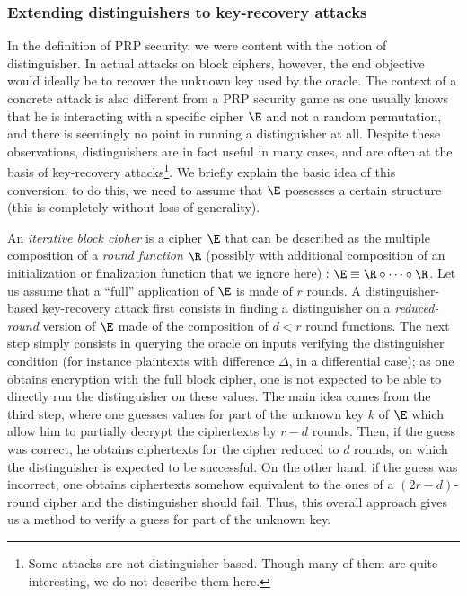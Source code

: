 \subsubsection{Extending distinguishers to key-recovery attacks}

In the definition of PRP security, we were content with the notion of distinguisher. In actual attacks on block ciphers, however, the end objective
would ideally be to recover the unknown key used by the oracle. The context of a concrete attack is also different from a PRP security game as one usually knows that he is interacting with a specific
cipher $\E$ and not a random permutation, and there is seemingly no point in running a distinguisher at all.
Despite these observations, distinguishers are in fact useful in many cases, and are often at the basis of key-recovery attacks\footnote{Some attacks
are not distinguisher-based. Though many of them are quite interesting, we do not describe them here.}. We briefly explain
the basic idea of this conversion; to do this, we need to assume that $\E$ possesses a certain structure (this is completely without loss of generality).

An \emph{iterative block cipher} is a cipher $\E$ that can be described as the multiple composition of a \emph{round function} $\R$ (possibly with additional
composition of an initialization or finalization function that we ignore here) : $\E \equiv \R \circ \cdots \circ \R$. Let us assume that a ``full''
application of $\E$ is made of $r$ rounds. A distinguisher-based key-recovery attack first consists in finding a distinguisher on
a \emph{reduced-round} version of $\E$ made of the composition of $d < r$ round functions. The next step simply consists in querying the oracle on inputs verifying the distinguisher condition (for instance
plaintexts with difference $\Delta$, in a differential case); as one obtains encryption with the full block cipher, one is not expected to be able to directly run the distinguisher
on these values. The main idea comes from the third step, where one guesses values for part of the unknown key $k$ of $\E$ which allow him to partially decrypt the ciphertexts by $r-d$ rounds. Then, if
the guess was correct, he obtains ciphertexts for the cipher reduced to $d$ rounds, on which the distinguisher is expected to be successful. On the other hand, if the guess was incorrect, one obtains
ciphertexts somehow equivalent to the ones of a $(2r-d)$-round cipher and the distinguisher should fail. Thus, this overall approach gives us a method to verify a guess for part of the unknown key.

